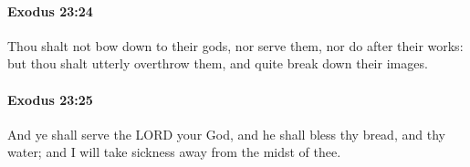 		\paragraph{Exodus 23:24} %
			\label{EXODUS-23-24}

			Thou shalt not bow down to their gods, nor serve them, nor do after their works: but thou shalt utterly overthrow them, and quite break down their images.


		\paragraph{Exodus 23:25} %
			\label{EXODUS-23-25}

			And ye shall serve the LORD your God, and he shall bless thy bread, and thy water; and I will take sickness away from the midst of thee.


